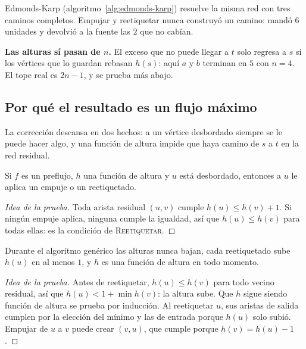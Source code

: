 \documentclass[11pt,letterpaper]{article}
\begin{document}
Edmonds-Karp (algoritmo~\ref{alg:edmonds-karp}) resuelve la misma red
con tres caminos completos. Empujar y reetiquetar nunca construyó un
camino: mandó $6$ unidades y devolvió a la fuente las $2$ que no
cabían.

\begin{ojo}
  \textbf{Las alturas sí pasan de $n$.} El exceso que no puede llegar
  a $t$ solo regresa a $s$ si los vértices que lo guardan rebasan
  $h(s)$: aquí $a$ y $b$ terminan en $5$ con $n = 4$. El tope real es
  $2n - 1$, y se prueba más abajo.
\end{ojo}


\subsection*{Por qué el resultado es un flujo máximo}

La corrección descansa en dos hechos: a un vértice desbordado siempre
se le puede hacer algo, y una función de altura impide que haya camino
de $s$ a $t$ en la red residual.

\begin{lema}
  \label{lem:push-siempre-aplica}
  Si $f$ es un preflujo, $h$ una función de altura y $u$ está
  desbordado, entonces a $u$ le aplica un empuje o un reetiquetado.
\end{lema}

\begin{proof}[Idea de la prueba]
  Toda arista residual $(u, v)$ cumple $h(u) \le h(v) + 1$. Si ningún
  empuje aplica, ninguna cumple la igualdad, así que $h(u) \le h(v)$
  para todas ellas: es la condición de \textsc{Reetiquetar}.
\end{proof}

\begin{lema}
  \label{lem:push-altura-valida}
  Durante el algoritmo genérico las alturas nunca bajan, cada
  reetiquetado sube $h(u)$ en al menos $1$, y $h$ es una función de
  altura en todo momento.
\end{lema}

\begin{proof}[Idea de la prueba]
  Antes de reetiquetar, $h(u) \le h(v)$ para todo vecino residual, así
  que $h(u) < 1 + \min h(v)$: la altura sube. Que $h$ sigue siendo
  función de altura se prueba por inducción. Al reetiquetar $u$, sus
  aristas de salida cumplen por la elección del mínimo y las de
  entrada porque $h(u)$ solo subió. Empujar de $u$ a $v$ puede crear
  $(v, u)$, que cumple porque $h(v) = h(u) - 1$.
\end{proof}
\end{document}
